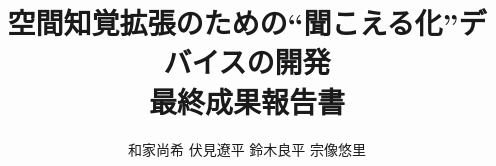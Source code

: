 \documentclass[11pt]{jsarticle}
\begin{document}
\newcommand{\heading}[1]{
    \vspace{0.1in}
    {\noindent {\underline {\textsf {\textbf #1}}}}
    \hspace{0.05in}
}

 \makeatletter
    \renewcommand{\thefigure}{
    \thesection.\arabic{figure}}
  \makeatother

  \makeatletter
    \renewcommand{\thetable}{%
    \thesection.\arabic{table}}
  \makeatother

\title{空間知覚拡張のための``聞こえる化''デバイスの開発\\最終成果報告書}
\author{和家尚希 伏見遼平 鈴木良平 宗像悠里}
\maketitle

\tableofcontents %
\thispagestyle{empty} %












\end{document}
